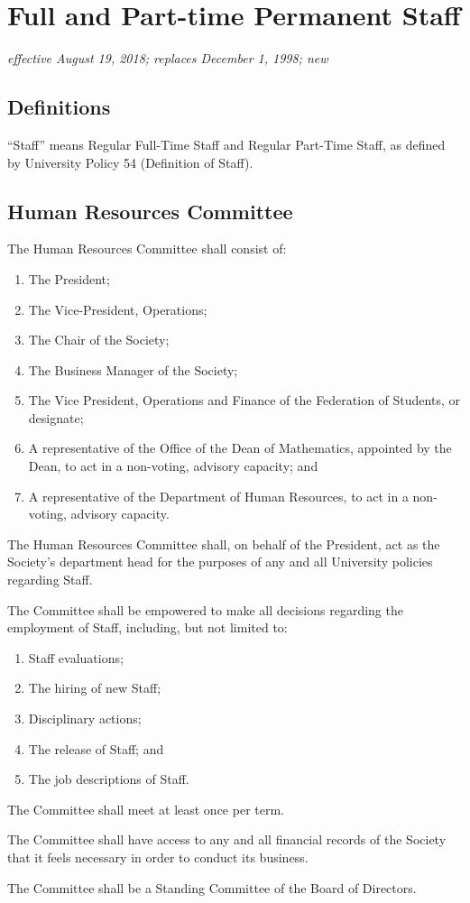 \section{Full and Part-time Permanent Staff}
\emph{effective August 19, 2018; replaces December 1, 1998; new}\\

\subsection{Definitions}
“Staff” means Regular Full-Time Staff and Regular Part-Time Staff, as defined
by University Policy 54 (Definition of Staff).

\subsection{Human Resources Committee}
The Human Resources Committee shall consist of:
\begin{enumerate}
    \item The President;
    \item The Vice-President, Operations;
    \item The Chair of the Society;
    \item The Business Manager of the Society;
    \item The Vice President, Operations and Finance of the Federation of 
        Students, or designate;
    \item A representative of the Office of the Dean of Mathematics, appointed
        by the Dean, to act in a non-voting, advisory capacity; and
    \item A representative of the Department of Human Resources, to act in a
        non-voting, advisory capacity.
\end{enumerate}

The Human Resources Committee shall, on behalf of the President, act as the
Society’s department head for the purposes of any and all University policies
regarding Staff.

The Committee shall be empowered to make all decisions regarding the employment
of Staff, including, but not limited to:
\begin{enumerate}
    \item Staff evaluations;
    \item The hiring of new Staff;
    \item Disciplinary actions;
    \item The release of Staff; and
    \item The job descriptions of Staff.
\end{enumerate}

The Committee shall meet at least once per term.

The Committee shall have access to any and all financial records of the Society
that it feels necessary in order to conduct its business.

The Committee shall be a Standing Committee of the Board of Directors.
